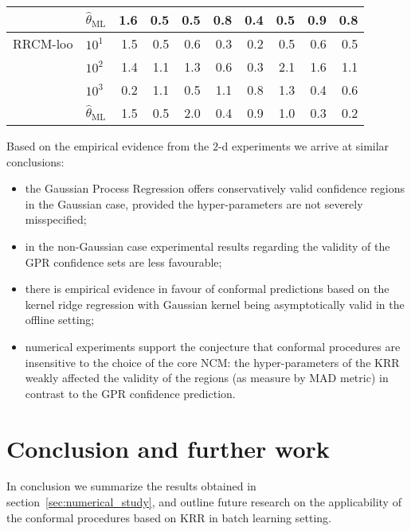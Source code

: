 \documentclass[a4paper,14pt]{extarticle}
\begin{document}
\begin{table}
\begin{tabular}{ll||rrrr|rrrr}
       & $\hat{\theta}_\text{ML}$ &      1.6 &      0.5 &      0.5 &      0.8 &      0.4 &      0.5 &      0.9 &      0.8 \\
  \midrule
  RRCM-loo & $10^1$ &      1.5 &      0.5 &      0.6 &      0.3 &      0.2 &      0.5 &      0.6 &      0.5 \\
       & $10^2$ &      1.4 &      1.1 &      1.3 &      0.6 &      0.3 &      2.1 &      1.6 &      1.1 \\
       & $10^3$ &      0.2 &      1.1 &      0.5 &      1.1 &      0.8 &      1.3 &      0.4 &      0.6 \\
       & $\hat{\theta}_\text{ML}$ &      1.5 &      0.5 &      2.0 &      0.4 &      0.9 &      1.0 &      0.3 &      0.2 \\
  \bottomrule
  \end{tabular}
\end{table}

Based on the empirical evidence from the $2$-d experiments we arrive at similar
conclusions: \begin{itemize}
  \item the Gaussian Process Regression offers conservatively valid confidence regions
  in the Gaussian case, provided the hyper-parameters are not severely misspecified;
  \item in the non-Gaussian case experimental results regarding the validity of the
  GPR confidence sets are less favourable;
  \item there is empirical evidence in favour of conformal predictions based on
  the kernel ridge regression with Gaussian kernel being asymptotically valid in
  the offline setting;
  \item numerical experiments support the  conjecture that conformal procedures
  are insensitive to the choice of the core NCM: the hyper-parameters of the KRR
  weakly affected the validity of the regions (as measure by MAD metric) in contrast
  to the GPR confidence prediction.
\end{itemize}



\section{Conclusion and further work} %
\label{sec:conclusion_and_further_work}

In conclusion we summarize the results obtained in section~\ref{sec:numerical_study},
and outline future research on the applicability of the conformal procedures based
on KRR in batch learning setting.
\end{document}

